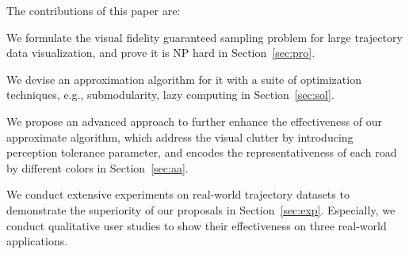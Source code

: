 The contributions of this paper are:
\squishlist
  \item We formulate the visual fidelity guaranteed sampling problem for large trajectory data visualization, and prove it is NP hard in Section~\ref{sec:pro}.
  \item We devise an approximation algorithm for it with a suite of optimization techniques, e.g., submodularity, lazy computing in Section~\ref{sec:sol}.
  \item We propose an advanced approach to further enhance the effectiveness of our approximate algorithm, which address the visual clutter by introducing perception tolerance parameter,
  and encodes the representativeness of each road by different colors in Section~\ref{sec:aa}.
  \item We conduct extensive experiments on real-world trajectory datasets to demonstrate the superiority of our proposals in Section~\ref{sec:exp}. Especially, we conduct qualitative user studies to show their effectiveness on three real-world applications.
\squishend



%


